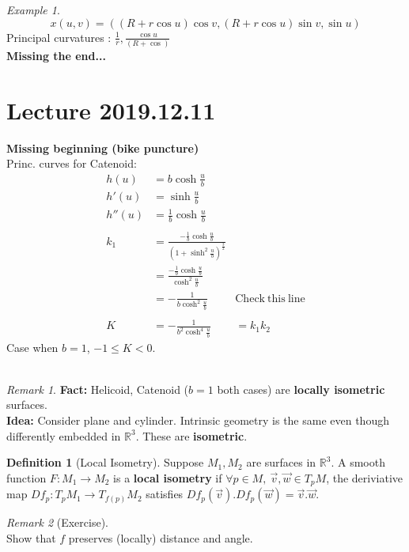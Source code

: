 \documentclass{article}
\newcommand{\R}{\mathbb{R}}
\theoremstyle{definition}
\newtheorem{definition}{Definition}[section]
\theoremstyle{remark}
\theoremstyle{example}
\newtheorem*{remark}{Remark}
\newtheorem*{example}{Example}
\begin{document}
	\begin{example}
		\[x(u,v)=\left((R+r\cos u)\cos v, (R+r\cos u)\sin v, \sin u\right)\]
		Principal curvatures : $\frac1r,\frac{\cos u}{(R + \cos)}$\\
		\textbf{Missing the end...}\\
	\end{example}

	\section*{Lecture 2019.12.11}
	\textbf{Missing beginning (bike puncture)}\\
	Princ. curves for Catenoid:
	\begin{align*}
		h(u)&=b \cosh \frac{u}{b}\\
		h'(u)&=\sinh \frac{u}{b}\\
		h''(u)&=\frac{1}{b}\cosh \frac{u}{b}\\
		\\k_1&=\frac{-\frac{1}{b}\cosh\frac{u}{b}}{\left(1+\sinh^2\frac{u}{b}\right)^\frac{3}{2}}\\
		&=\frac{-\frac1b\cosh\frac{u}{b}}{\cosh^2\frac{u}{b}}\\
		&=-\frac{1}{b \cosh^2 \frac{u}{b}} & \mathrm{Check\ this\ line}\\
		\\
		K&=-\frac{1}{b^2\cosh^4 \frac{u}{b}} & = k_1k_2	
	\end{align*}
	Case when $b=1$, $-1 \leq K < 0$.\\
	\\
	\begin{remark}
		\textbf{Fact: }Helicoid, Catenoid ($b=1$ both cases) are \textbf{locally isometric} surfaces.\\
		\textbf{Idea: }Consider plane and cylinder. Intrinsic geometry is the same even though differently embedded in $\R^3$. These are \textbf{isometric}.\\
	\end{remark}

	\begin{definition}[Local Isometry]
		Suppose $M_1, M_2$ are surfaces in $\R^3$. A smooth function $F:M_1\to M_2$ is a \textbf{local isometry} if $\forall p \in M,\ \vec{v},\vec{w} \in T_pM$, the deriviative map $Df_p:T_pM_1 \to T_{f(p)}M_2$ satisfies $Df_p(\vec{v}).Df_p(\vec{w})=\vec{v}.\vec{w}$.
	\end{definition}

	\begin{remark}[Exercise]\ \\
		Show that $f$ preserves (locally) distance and angle.
	\end{remark}
\end{document}
